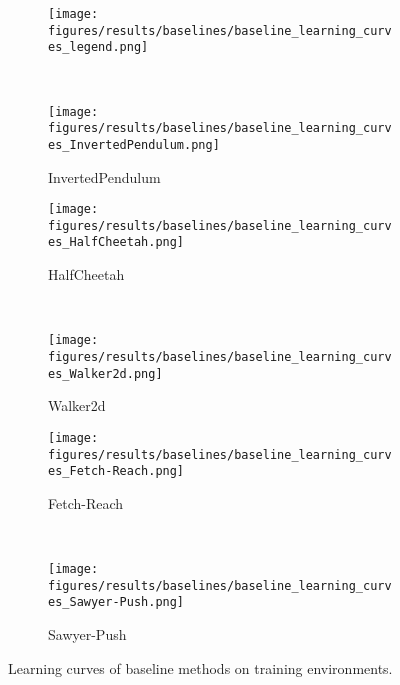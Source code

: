 \begin{figure}[ht]
    \centering
    \begin{subfigure}[t]{0.7\linewidth}
        \centering
        \texttt{[image: figures/results/baselines/baseline\_learning\_curves\_legend.png]}
    \end{subfigure}
    \\
    \begin{subfigure}[t]{0.45\linewidth}
        \centering
        \texttt{[image: figures/results/baselines/baseline\_learning\_curves\_InvertedPendulum.png]}
        \caption{InvertedPendulum}
        \label{fig:baseline_learning_curves:invertedpendulum}
    \end{subfigure}
    \begin{subfigure}[t]{0.45\linewidth}
        \centering
        \texttt{[image: figures/results/baselines/baseline\_learning\_curves\_HalfCheetah.png]}
        \caption{HalfCheetah}
        \label{fig:baseline_learning_curves:halfcheetah}
    \end{subfigure}
    \\
    \begin{subfigure}[t]{0.45\linewidth}
        \centering
        \texttt{[image: figures/results/baselines/baseline\_learning\_curves\_Walker2d.png]}
        \caption{Walker2d}
        \label{fig:baseline_learning_curves:walker2d}
    \end{subfigure}
    \begin{subfigure}[t]{0.45\linewidth}
        \centering
        \texttt{[image: figures/results/baselines/baseline\_learning\_curves\_Fetch-Reach.png]}
        \caption{Fetch-Reach}
        \label{fig:baseline_learning_curves:fetchreach}
    \end{subfigure}
    \\
    \begin{subfigure}[t]{0.45\linewidth}
        \centering
        \texttt{[image: figures/results/baselines/baseline\_learning\_curves\_Sawyer-Push.png]}
        \caption{Sawyer-Push}
        \label{fig:baseline_learning_curves:sawyer_push}
    \end{subfigure}
    \caption{
        Learning curves of baseline methods on training environments.
    }
\label{fig:baseline_learning_curves}
\end{figure}

